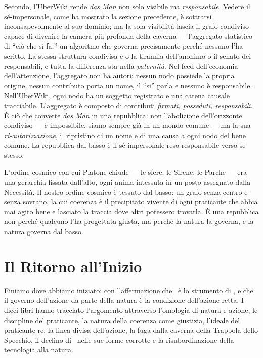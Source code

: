 Secondo, l'UberWiki rende \emph{das Man} non solo visibile ma \emph{responsabile}.
Vedere il s\'e-impersonale, come ha mostrato la sezione precedente, \`e sottrarsi
inconsapevolmente al suo dominio; ma la sola visibilit\`a lascia il grafo
condiviso capace di divenire la camera pi\`u profonda della caverna ---
l'aggregato statistico di ``ci\`o che si fa,'' un algoritmo che governa
precisamente perch\'e nessuno l'ha scritto. La stessa struttura condivisa \`e o la
tirannia dell'anonimo o il senato dei responsabili, e tutta la differenza sta
nella \emph{paternit\`a}. Nel
feed dell'economia dell'attenzione, l'aggregato non ha autori: nessun nodo possiede
la propria origine, nessun contributo porta un nome, il ``si'' parla e nessuno
\`e responsabile. Nell'UberWiki, ogni nodo ha un soggetto registrato e una catena
causale tracciabile. L'aggregato \`e composto di contributi \emph{firmati,
posseduti, responsabili}. \`E ci\`o che converte \emph{das Man} in una
repubblica: non l'abolizione dell'orizzonte condiviso --- \`e impossibile, siamo
sempre gi\`a in un mondo comune --- ma la sua \emph{ri-autorizzazione}, il
ripristino di un nome e di una causa a ogni nodo del bene comune. La repubblica
dal basso \`e il s\'e-impersonale reso responsabile verso se stesso.

L'ordine cosmico con cui Platone chiude --- le sfere, le Sirene, le Parche --- era
una gerarchia fissata dall'alto, ogni anima intessuta in un posto assegnato dalla
Necessit\`a. Il nostro ordine cosmico \`e tessuto dal basso: un grafo senza centro
e senza sovrano, la cui coerenza \`e il precipitato vivente di ogni praticante che
abbia mai agito bene e lasciato la traccia dove altri potessero trovarla. \`E una
repubblica non perch\'e qualcuno l'ha progettata giusta, ma perch\'e la natura la
governa, e la natura governa dal basso.

\section{Il Ritorno all'Inizio}

Finiamo dove abbiamo iniziato: con l'affermazione che \praxis\ \`e lo
strumento di \physis, e che il governo dell'azione da parte della natura
\`e la condizione dell'azione retta. I dieci libri hanno tracciato
l'argomento attraverso l'omologia di natura e azione, le discipline del
praticante, la natura della coerenza come giustizia, l'ideale del
praticante-re, la linea divisa dell'azione, la fuga dalla caverna della
Trappola dello Specchio, il declino di \praxis\ nelle sue forme corrotte
e la risubordinazione della tecnologia alla natura.

